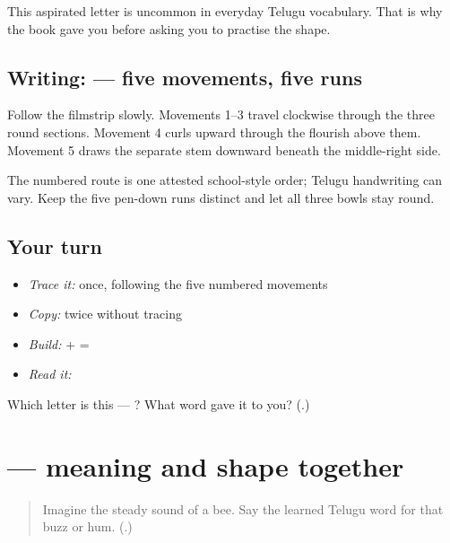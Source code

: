 This aspirated letter is uncommon in everyday Telugu vocabulary. That is why the book gave you \textbf{} before asking you to practise the shape.

\subsection*{Writing:  — five movements, five runs}

Follow the filmstrip slowly. Movements 1–3 travel clockwise through the three round sections. Movement 4 curls upward through the flourish above them. Movement 5 draws the separate stem downward beneath the middle-right side.

The numbered route is one attested school-style order; Telugu handwriting can vary. Keep the five pen-down runs distinct and let all three bowls stay round.

\subsection*{Your turn}
\begin{itemize}
\raggedright
  \item \emph{Trace it:} \textbf{} once, following the five numbered movements
  \item \emph{Copy:} \textbf{} twice without tracing
  \item \emph{Build:} \textbf{} + \textbf{} = \textbf{}
  \item \emph{Read it:} \textbf{}
\end{itemize}

\begin{tcolorbox}[breakable,colback=teal!4,colframe=teal!35!black,title={Before you move on}]
Which letter is this — \textbf{}? What word gave it to you? (\textbf{}.)
\end{tcolorbox}
\section[\texorpdfstring{\te{ఝంకారం} (jhaṅkāraṁ)}{ఝంకారం (jhaṅkāraṁ)}]{ — meaning and shape together}

\label{lesson:TE-R152-jhankaram-recall}



\begin{quote}
Imagine the steady sound of a bee. Say the learned Telugu word for that buzz or hum. (\textbf{}.)
\end{quote}

